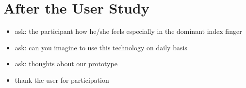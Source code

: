 \documentclass[10pt,a4paper]{article}
\begin{document}
\section{After the User Study}
\begin{itemize}
\item ask: the participant how he/she feels especially in the dominant index finger
\item ask: can you imagine to use this technology on daily basis
\item ask: thoughts about our prototype
\item thank the user for participation 
\end{itemize}
\end{document}
